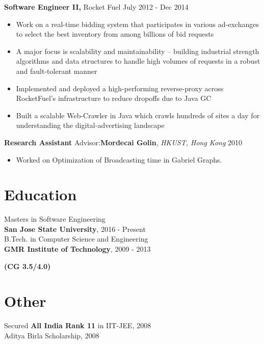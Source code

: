 \documentclass[margin]{res}
\begin{document}
\begin{resume}
 {\bf Software Engineer II,} Rocket Fuel \hfill July 2012 - Dec 2014
 \begin{itemize} \itemsep -2pt  %
 \item Work on a real-time bidding system that participates in various ad-exchanges to select the best inventory from among billions of bid requests
 \item A major focus is scalability and maintainability -- building industrial strength algorithms and data structures to handle high volumes of requests in a robust and fault-tolerant manner
 \item Implemented and deployed a high-performing reverse-proxy across RocketFuel's infrastructure to reduce dropoffs due to Java GC
 \item Built a scalable Web-Crawler in Java which crawls hundreds of sites a day for understanding the digital-advertising landscape
 \end{itemize}

 {\bf Research Assistant} Advisor:\textbf{Mordecai Golin}, \textit{HKUST, Hong Kong} \hfill 2010
 \begin{itemize} \itemsep -2pt  %
 \item Worked  on  Optimization  of  Broadcasting  time  in  Gabriel  Graphs.
 \end{itemize}

\section{Education}
  Masters in Software Engineering \\
  {\bf San Jose State University}, 2016 - Present \\
  
  B.Tech. in Computer Science and Engineering \\
  {\bf GMR Institute of Technology}, 2009 - 2013 {\bf (CG 3.5/4.0) \\
  
\section{Other}
 Secured {\bf All India Rank 11} in IIT-JEE, 2008 \\
 Aditya Birla Scholarship, 2008 \\


}
\end{resume}
\end{document}
